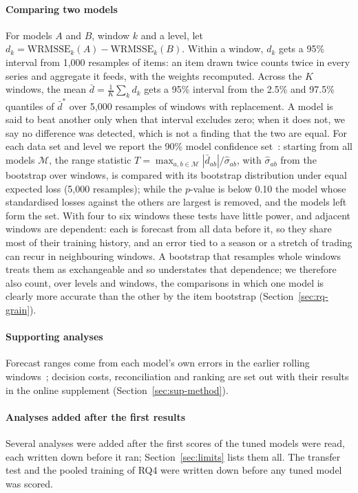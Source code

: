 \paragraph{Comparing two models}
For models $A$ and $B$, window $k$ and a level, let $d_k = \mathrm{WRMSSE}_k(A) -
\mathrm{WRMSSE}_k(B)$. Within a window, $d_k$ gets a 95\% interval from 1,000
resamples of items: an item drawn twice counts twice in every series and
aggregate it feeds, with the weights recomputed. Across the $K$ windows, the
mean $\bar d = \frac1K\sum_k d_k$ gets a 95\% interval from the 2.5\% and 97.5\%
quantiles of $\bar d^{*}$ over 5,000 resamples of windows with replacement. A
model is said to beat another only when that interval excludes zero;
when it does not, we say no difference was detected, which is not a finding that
the two are equal. For each data set and level we report the 90\% model
confidence set~\cite{hansen2011}: starting from all models $\mathcal M$, the range
statistic $T = \max_{a,b\in\mathcal M} |\bar d_{ab}|/\hat\sigma_{ab}$, with
$\hat\sigma_{ab}$ from the bootstrap over windows, is compared with its
bootstrap distribution under equal expected loss (5,000 resamples); while the
$p$-value is below 0.10 the model whose standardised losses against the others
are largest is removed, and the models left form the set. With four to six windows these tests have little power, and adjacent
windows are dependent: each is forecast from all data before it, so they share
most of their training history, and an error tied to a season or a stretch of
trading can recur in neighbouring windows. A bootstrap that resamples whole
windows treats them as exchangeable and so understates that dependence; we
therefore also count, over levels and windows, the comparisons in which one model
is clearly more accurate than the other by the item bootstrap
(Section~\ref{sec:rq-grain}).

\ifjournal
\paragraph{Supporting analyses} Forecast ranges come from each model's own errors in
the earlier rolling windows~\cite{vovk2005}; decision costs, reconciliation and ranking are
set out with their results in the online supplement (Section~\ref{sec:sup-method}).

\else

\fi

\paragraph{Analyses added after the first results}
Several analyses were added after the first scores of the tuned models were
read, each written down before it ran; Section~\ref{sec:limits} lists them all.
The transfer test and the pooled training of RQ4 were written down before any
tuned model was scored.



